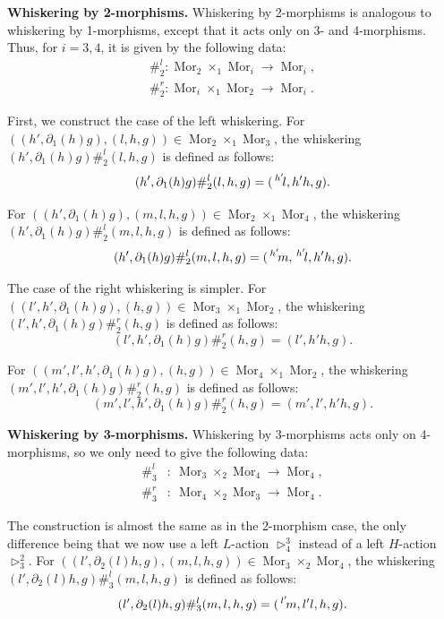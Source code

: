 \documentclass[11pt, reqno]{amsart} %
\newcommand{\act}[1]{\,\sp{#1}\!}
\newcommand{\del}{\partial}
\newcommand{\mor}{{\mathop{\mathrm{Mor}}}}
\theoremstyle{definition}
\theoremstyle{remark}
\numberwithin{equation}{section}
\begin{document}
\vspace{.5em}
\noindent
{\bf Whiskering by 2-morphisms.} Whiskering by 2-morphisms is analogous to whiskering by 1-morphisms, except that it acts only on 3- and 4-morphisms. Thus, for $i = 3,4$, it is given by the following data:
\begin{equation*}
\begin{aligned}
\#^l_2: \mor_2 \times_1 \mor_i \rightarrow \mor_i,\\
\#^r_2: \mor_i \times_1 \mor_2 \rightarrow \mor_i.
\end{aligned}
\end{equation*}

First, we construct the case of the left whiskering.
For $\left( (h', \del_1(h)g) , (l,h,g) \right)\in \mor_2 \times_1 \mor_3$, the whiskering $(h', \del_1(h)g)  \#^l_2  (l,h,g)$ is defined as follows:
\[
(h', \del_1(h)g)  \#^l_2  (l,h,g) = (\act{h'}l,h' h, g).
\]

For $\left( (h', \del_1(h)g) , (m,l,h,g) \right)\in \mor_2 \times_1 \mor_4$, the whiskering $(h', \del_1(h)g)  \#^l_2  (m,l,h,g)$ is defined as follows:
\[
(h', \del_1(h)g)  \#^l_2  (m,l,h,g) = (\act{h'}m, \act{h'}l,h' h, g).
\]

The case of the right whiskering is simpler. 
For $\left( (l',h', \del_1(h)g) , (h,g) \right)\in \mor_3 \times_1 \mor_2$, the whiskering $(l',h', \del_1(h)g) \#^r_2  (h,g)$ is defined as follows:
\[
(l',h', \del_1(h)g)   \#^r_2  (h,g) = (l', h' h, g).
\]

For $\left( (m', l',h', \del_1(h)g) , (h,g) \right)\in \mor_4 \times_1 \mor_2$, the whiskering $(m', l',h', \del_1(h)g) \#^r_2  (h,g)$ is defined as follows:
\[
(m', l',h', \del_1(h)g)   \#^r_2  (h,g) = (m', l', h' h, g).
\]

\vspace{.5em}
\noindent
{\bf Whiskering by 3-morphisms.}
 Whiskering by 3-morphisms acts only on 4-morphisms, so we only need to give the following data:
\begin{align*}
  \#^l_3&:~\mor_3 \times_2 \mor_4 \rightarrow \mor_4,\\
  \#^r_3&:~\mor_4 \times_2 \mor_3 \rightarrow \mor_4.
\end{align*}

The construction is almost the same as in the 2-morphism case, the only difference being that we now use a left $L$-action $\triangleright^3_4$ instead of a left $H$-action $\triangleright^2_3$. For $\left( (l',\del_2(l)h, g) , (m,l,h,g) \right)\in \mor_3 \times_2 \mor_4$, the whiskering $(l',\del_2(l)h, g)  \#^l_3  (m,l,h,g)$ is defined as follows:
\[
(l',\del_2(l)h, g)  \#^l_3  (m,l,h,g) = (\act{l'}m,l'l, h, g).
\]
\end{document}
